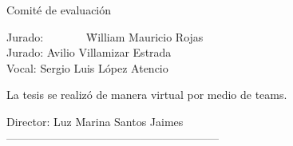 
\begin{prologo}{Comité de evaluación}

	\begin{tabbing}
	Jurado: \ \ \ \ \ \ \ \= {William Mauricio Rojas}\\ [3mm]
	Jurado: \> {Avilio Villamizar Estrada}\\ [3mm]
	Vocal: \> {Sergio Luis López Atencio}\\ [3mm]
    \end{tabbing}
La tesis se realizó de manera virtual por medio de teams.
\vspace{15mm}
\begin{center}
	Director: Luz Marina Santos Jaimes\\[4mm]

	---------------------------------------------------------\\
\end{center}
\vfill

\end{prologo}




